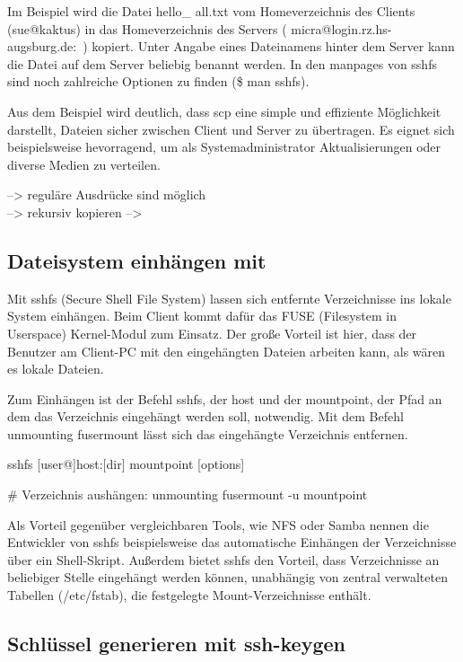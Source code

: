 \documentclass[ngerman,pdf]{wkcms}    %
\begin{document}
Im Beispiel wird die Datei \IT hello\_ \IT all.txt vom Homeverzeichnis des Clients (sue@kaktus) in das Homeverzeichnis des Servers ( micra@login.rz.hs-augsburg.de:~) kopiert. Unter Angabe eines Dateinamens hinter dem Server kann die Datei auf dem Server beliebig benannt werden. In den manpages von sshfs sind noch zahlreiche Optionen zu finden (\$ man sshfs).

Aus dem Beispiel wird deutlich, dass \IT scp eine simple und effiziente Möglichkeit darstellt, Dateien sicher zwischen Client und Server zu übertragen. Es eignet sich beispielsweise hevorragend, um als Systemadministrator Aktualisierungen oder diverse Medien zu verteilen. \cite[S. 80]{openssh_book}

--> reguläre Ausdrücke sind möglich \\
--> rekursiv kopieren
--> 

\subsection{Dateisystem einhängen mit }

Mit \IT sshfs (\IT Secure \IT Shell \IT File \IT System) lassen sich entfernte Verzeichnisse ins lokale System einhängen. Beim Client kommt dafür das FUSE (Filesystem in Userspace) Kernel-Modul zum Einsatz. Der große Vorteil ist hier, dass der Benutzer am Client-PC mit den eingehängten Dateien arbeiten kann, als wären es lokale Dateien.

Zum Einhängen ist der Befehl \IT sshfs, der \IT host und der \IT mountpoint,
\Dh der Pfad an dem das Verzeichnis eingehängt werden soll, notwendig.
Mit dem Befehl \IT unmounting \IT fusermount lässt sich das eingehängte Verzeichnis entfernen.

\begin{program}
sshfs [user@]host:[dir] mountpoint [options]

# Verzeichnis aushängen:
unmounting fusermount -u mountpoint
\end{program}

Als Vorteil gegenüber vergleichbaren Tools, wie NFS oder Samba nennen die Entwickler von \IT sshfs beispielsweise das automatische Einhängen der Verzeichnisse über ein Shell-Skript. Außerdem bietet \IT sshfs den Vorteil, dass Verzeichnisse an beliebiger Stelle eingehängt werden können, unabhängig von zentral verwalteten Tabellen (/etc/fstab), die festgelegte Mount-Verzeichnisse enthält. \cite{sshfs}

\subsection{Schlüssel generieren mit \IT ssh-\IT keygen}
\end{document}
